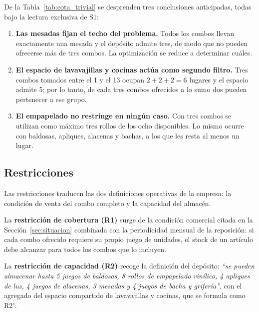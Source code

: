 \documentclass[10pt,a4paper]{article}
\newcommand{\cita}[1]{\emph{``#1''}}
\begin{document}
De la Tabla~\ref{tab:cota_trivial} se desprenden tres conclusiones anticipadas,
todas bajo la lectura exclusiva de S1:

\begin{enumerate}
  \item \textbf{Las mesadas fijan el techo del problema.} Todos los combos
  llevan exactamente una mesada y el depósito admite tres, de modo que no pueden
  ofrecerse más de tres combos. La optimización se reduce a determinar cuáles.
  \item \textbf{El espacio de lavavajillas y cocinas actúa como segundo
  filtro.} Tres combos tomados entre el 1 y el 13 ocupan $2+2+2 = 6$ lugares y
  el espacio admite 5; por lo tanto, de cada tres combos ofrecidos a lo sumo dos
  pueden pertenecer a ese grupo.
  \item \textbf{El empapelado no restringe en ningún caso.} Con tres combos se
  utilizan como máximo tres rollos de los ocho disponibles. Lo mismo ocurre con
  baldosas, apliques, alacenas y bachas, a los que les resta al menos un lugar.
\end{enumerate}

\subsection{Restricciones}
\label{sec:restricciones}

Las restricciones traducen las dos definiciones operativas de la empresa: la
condición de venta del combo completo y la capacidad del almacén.

La \textbf{restricción de cobertura (R1)} surge de la condición comercial citada
en la Sección~\ref{sec:situacion} combinada con la periodicidad mensual de la
reposición: si cada combo ofrecido requiere su propio juego de unidades, el
stock de un artículo debe alcanzar para todos los combos que lo incluyen.

La \textbf{restricción de capacidad (R2)} recoge la definición del depósito:
\cita{se pueden almacenar hasta 5 juegos de baldosas, 8 rollos de empapelado
vinílico, 4 apliques de luz, 4 juegos de alacenas, 3 mesadas y 4 juegos de bacha
y grifería}, con el agregado del espacio compartido de lavavajillas y cocinas,
que se formula como R2$'$.
\end{document}
